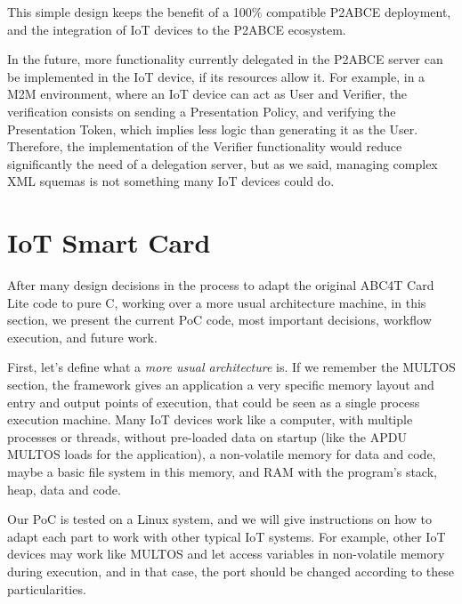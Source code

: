 \hfil


This simple design keeps the benefit of a 100\% compatible P2ABCE deployment, and the integration of IoT devices to the P2ABCE ecosystem.

In the future, more functionality currently delegated in the P2ABCE server can be implemented in the IoT device, if its resources allow it. For example, in a M2M environment, where an IoT device can act as User and Verifier, the verification consists on sending a Presentation Policy, and verifying the Presentation Token, which implies less logic than generating it as the User. Therefore, the implementation of the Verifier functionality would reduce significantly the need of a delegation server, but as we said, managing complex XML squemas is not something many IoT devices could do.



\section{IoT Smart Card}

After many design decisions in the process to adapt the original ABC4T Card Lite code to pure C, working over a more usual architecture machine, in this section, we present the current \ac{PoC} code, most important decisions, workflow execution, and future work.

First, let's define what a \textit{more usual architecture} is. If we remember the MULTOS section, the framework gives an application a very specific memory layout and entry and output points of execution, that could be seen as a single process execution machine. Many IoT devices work like a computer, with multiple processes or threads, without pre-loaded data on startup (like the APDU MULTOS loads for the application), a non-volatile memory for data and code, maybe a basic file system in this memory, and RAM with the program's stack, heap, data and code.

Our PoC is tested on a Linux system, and we will give instructions on how to adapt each part to work with other typical IoT systems.
For example, other IoT devices may work like MULTOS and let access variables in non-volatile memory during execution, and in that case, the port should be changed according to these particularities.


\hfil

